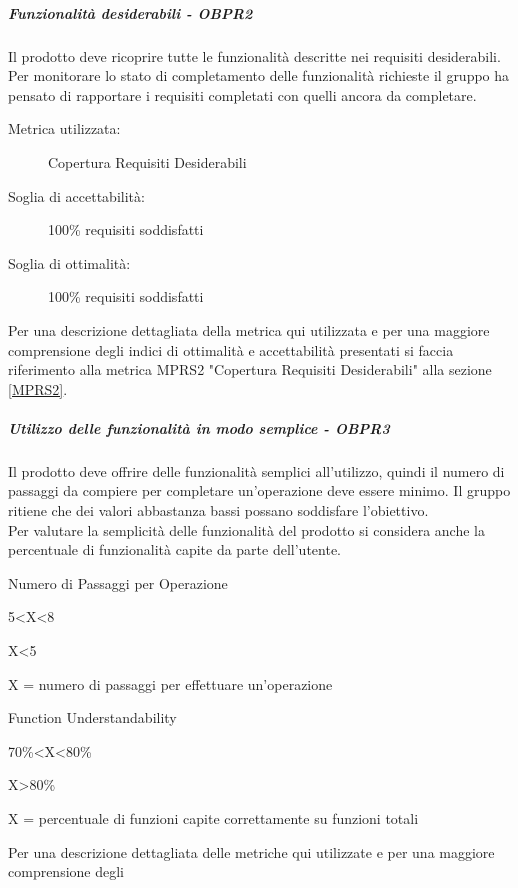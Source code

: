 \documentclass[../PianoDiQualifica.tex]{subfiles}
\begin{document}
				\subparagraph{Funzionalità desiderabili - OBPR2}	
				Il prodotto deve ricoprire tutte le funzionalità descritte nei requisiti desiderabili. Per monitorare lo stato di completamento delle funzionalità richieste il gruppo ha pensato di rapportare i requisiti completati con quelli ancora da completare.
					\begin{description}
						\item [Metrica utilizzata:] Copertura Requisiti Desiderabili
						\item [Soglia di accettabilità:] 100\% requisiti soddisfatti
						\item [Soglia di ottimalità:] 100\% requisiti soddisfatti
					\end{description}
					Per una descrizione dettagliata della metrica qui utilizzata e per una maggiore comprensione degli indici di ottimalità e accettabilità presentati si faccia riferimento alla metrica MPRS2 "Copertura Requisiti Desiderabili" alla sezione \ref{MPRS2}.
				\subparagraph{Utilizzo delle funzionalità in modo semplice - OBPR3}
				Il prodotto deve offrire delle funzionalità semplici all'utilizzo, quindi il numero di passaggi da compiere per completare un'operazione deve essere minimo. Il gruppo ritiene che dei valori abbastanza bassi possano soddisfare l'obiettivo.\\
				Per valutare la semplicità delle funzionalità del prodotto si considera anche la percentuale di funzionalità capite da parte dell'utente.
					\begin{description}
						\item [Metrica utilizzata:] Numero di Passaggi per Operazione
						\item [Soglia di accettabilità:] 5<X<8
						\item [Soglia di ottimalità:] X<5
						\item X = numero di passaggi per effettuare un'operazione
					\end{description}
					\begin{description}
						\item [Metrica utilizzata:] Function Understandability
						\item [Soglia di accettabilità:] 70\%<X<80\%
						\item [Soglia di ottimalità:] X>80\%
						\item X = percentuale di funzioni capite correttamente su funzioni totali
					\end{description}
					Per una descrizione dettagliata delle metriche qui utilizzate e per una maggiore comprensione degli
\end{document}
